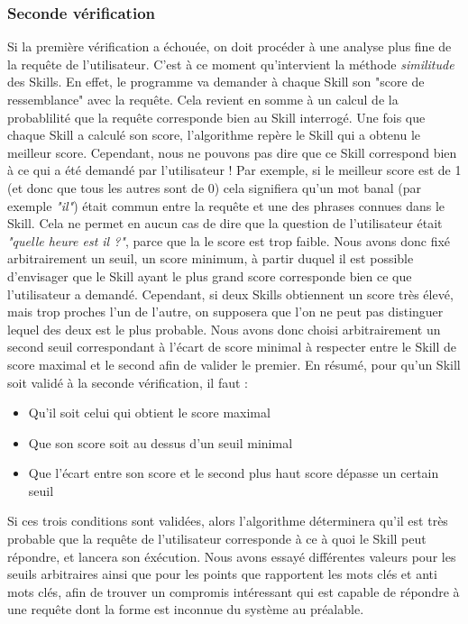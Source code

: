 \documentclass[a4paper,10pt]{report}
\begin{document}
        \subsubsection{Seconde vérification}
        {Si la première vérification a échouée, on doit procéder à une analyse plus fine de la requête de l'utilisateur. C'est à ce moment qu'intervient la méthode \textit{similitude} des Skills. En effet, le programme va demander à chaque Skill son "score de ressemblance" avec la requête. Cela revient en somme à un calcul de la probablilité que la requête corresponde bien au Skill interrogé. Une fois que chaque Skill a calculé son score, l'algorithme repère le Skill qui a obtenu le meilleur score. Cependant, nous ne pouvons pas dire que ce Skill correspond bien à ce qui a été demandé par l'utilisateur ! Par exemple, si le meilleur score est de 1 (et donc que tous les autres sont de 0) cela signifiera qu'un mot banal (par exemple \textit{"il"}) était commun entre la requête et une des phrases connues dans le Skill. Cela ne permet en aucun cas de dire que la question de l'utilisateur était \textit{"quelle heure est il ?"}, parce que la le score est trop faible. Nous avons donc fixé arbitrairement un seuil, un score minimum, à partir duquel il est possible d'envisager que le Skill ayant le plus grand score corresponde bien ce que l'utilisateur a demandé. Cependant, si deux Skills obtiennent un score très élevé, mais trop proches l'un de l'autre, on supposera que l'on ne peut pas distinguer lequel des deux est le plus probable. Nous avons donc choisi arbitrairement un second seuil correspondant à l'écart de score minimal à respecter entre le Skill de score maximal et le second afin de valider le premier.}
        {En résumé, pour qu'un Skill soit validé à la seconde vérification, il faut :}
        \begin{itemize}
          \item Qu'il soit celui qui obtient le score maximal
          \item Que son score soit au dessus d'un seuil minimal
          \item Que l'écart entre son score et le second plus haut score dépasse un certain seuil
        \end{itemize}
        {Si ces trois conditions sont validées, alors l'algorithme déterminera qu'il est très probable que la requête de l'utilisateur corresponde à ce à quoi le Skill peut répondre, et lancera son éxécution. Nous avons essayé différentes valeurs pour les seuils arbitraires ainsi que pour les points que rapportent les mots clés et anti mots clés, afin de trouver un compromis intéressant qui est capable de répondre à une requête dont la forme est inconnue du système au préalable.}
\end{document}
